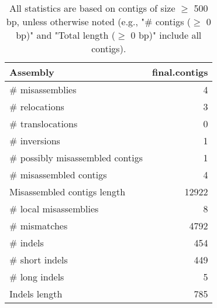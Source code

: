 \documentclass[12pt,a4paper]{article}
\begin{document}
\begin{table}[ht]
\begin{center}
\caption{All statistics are based on contigs of size $\geq$ 500 bp, unless otherwise noted (e.g., "\# contigs ($\geq$ 0 bp)" and "Total length ($\geq$ 0 bp)" include all contigs).}
\begin{tabular}{|l*{1}{|r}|}
\hline
Assembly & final.contigs \\ \hline
\# misassemblies & 4 \\ \hline
\hspace{5mm}\# relocations & 3 \\ \hline
\hspace{5mm}\# translocations & 0 \\ \hline
\hspace{5mm}\# inversions & 1 \\ \hline
\# possibly misassembled contigs & 1 \\ \hline
\# misassembled contigs & 4 \\ \hline
Misassembled contigs length & 12922 \\ \hline
\# local misassemblies & 8 \\ \hline
\# mismatches & 4792 \\ \hline
\# indels & 454 \\ \hline
\hspace{5mm}\# short indels & 449 \\ \hline
\hspace{5mm}\# long indels & 5 \\ \hline
Indels length & 785 \\ \hline
\end{tabular}
\end{center}
\end{table}
\end{document}
